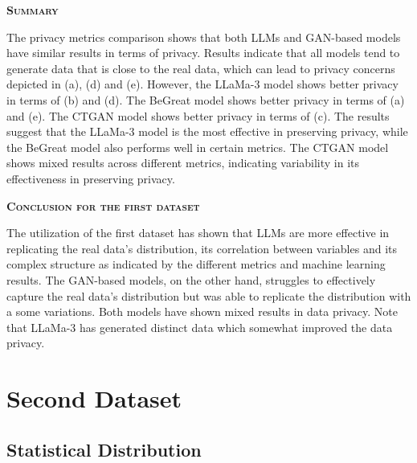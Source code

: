 \vspace{1cm}

\noindent \textsc{ \textbf{Summary}}

The privacy metrics comparison shows that both LLMs and GAN-based models have similar results in terms of privacy. Results indicate that all models tend to generate data that is close to the real data, which can lead to privacy concerns depicted in (a), (d) and (e). However, the LLaMa-3 model shows better privacy in terms of (b) and (d). The BeGreat model shows better privacy in terms of (a) and (e). The CTGAN model shows better privacy in terms of (c). The results suggest that the LLaMa-3 model is the most effective in preserving privacy, while the BeGreat model also performs well in certain metrics. The CTGAN model shows mixed results across different metrics, indicating variability in its effectiveness in preserving privacy.

\vspace{1cm}

\noindent \textsc{ \textbf{Conclusion for the first dataset}}

The utilization of the first dataset has shown that LLMs are more effective in replicating the real data's distribution, its correlation between variables and its complex structure as indicated by the different metrics and machine learning results. The GAN-based models, on the other hand, struggles to effectively capture the real data's distribution but was able to replicate the distribution with a some variations. Both models have shown mixed results in data privacy. Note that LLaMa-3 has generated distinct data which somewhat improved the data privacy.




\section{Second Dataset}

\subsection{Statistical Distribution}

